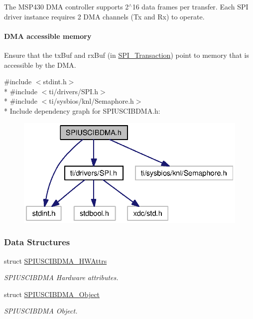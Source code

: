 The M\-S\-P430 D\-M\-A controller supports 2$^\wedge$16 data frames per transfer. Each S\-P\-I driver instance requires 2 D\-M\-A channels (Tx and Rx) to operate.

\paragraph*{D\-M\-A accessible memory}

Ensure that the tx\-Buf and rx\-Buf (in \hyperlink{struct_s_p_i___transaction}{S\-P\-I\-\_\-\-Transaction}) point to memory that is accessible by the D\-M\-A. 

{\ttfamily \#include $<$stdint.\-h$>$}\\*
{\ttfamily \#include $<$ti/drivers/\-S\-P\-I.\-h$>$}\\*
{\ttfamily \#include $<$ti/sysbios/knl/\-Semaphore.\-h$>$}\\*
Include dependency graph for S\-P\-I\-U\-S\-C\-I\-B\-D\-M\-A.\-h\-:
\nopagebreak
\begin{figure}[H]
\begin{center}
\leavevmode
\includegraphics[width=322pt]{_s_p_i_u_s_c_i_b_d_m_a_8h__incl}
\end{center}
\end{figure}
\subsubsection*{Data Structures}
\begin{DoxyCompactItemize}
\item 
struct \hyperlink{struct_s_p_i_u_s_c_i_b_d_m_a___h_w_attrs}{S\-P\-I\-U\-S\-C\-I\-B\-D\-M\-A\-\_\-\-H\-W\-Attrs}
\begin{DoxyCompactList}\small\item\em S\-P\-I\-U\-S\-C\-I\-B\-D\-M\-A Hardware attributes. \end{DoxyCompactList}\item 
struct \hyperlink{struct_s_p_i_u_s_c_i_b_d_m_a___object}{S\-P\-I\-U\-S\-C\-I\-B\-D\-M\-A\-\_\-\-Object}
\begin{DoxyCompactList}\small\item\em S\-P\-I\-U\-S\-C\-I\-B\-D\-M\-A Object. \end{DoxyCompactList}\end{DoxyCompactItemize}

